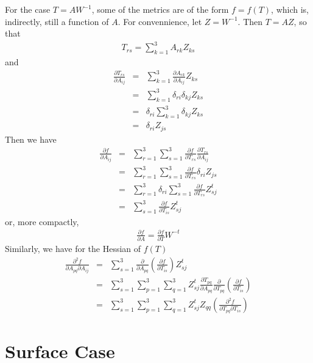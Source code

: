 \documentclass{report}
\begin{document}
 \newline
For the case $T = A W^{-1}$, some of the metrics are of the form $f=f(T)$,
which is, indirectly, still a function of $A$.  For convennience, let
$Z = W^{-1}$.  Then $T = A Z$, so that 
\begin{eqnarray}
T_{rs} = \sum_{k=1}^3 A_{rk} Z_{ks}
\end{eqnarray}
and 
\begin{eqnarray}
\frac{\partial T_{rs}}{\partial A_{ij}} & = & \sum_{k=1}^3 \frac{\partial A_{rk}}{\partial A_{ij}} Z_{ks} \\
 & = & \sum_{k=1}^3 \delta_{ri} \delta_{kj} Z_{ks} \\
 & = & \delta_{ri} \sum_{k=1}^3 \delta_{kj} Z_{ks} \\
 & = & \delta_{ri} Z_{js}
\end{eqnarray}
Then we have
\begin{eqnarray}
\frac{\partial f}{\partial A_{ij}} & = & \sum_{r=1}^3 \sum_{s=1}^3 \frac{\partial f}{\partial T_{rs}} \frac{\partial T_{rs}}{\partial A_{ij}} \\
 & = & \sum_{r=1}^3 \sum_{s=1}^3 \frac{\partial f}{\partial T_{rs}} \delta_{ri} Z_{js} \\
 & = & \sum_{r=1}^3 \delta_{ri} \sum_{s=1}^3 \frac{\partial f}{\partial T_{rs}} Z_{sj}^t \\
 & = & \sum_{s=1}^3 \frac{\partial f}{\partial T_{is}} Z_{sj}^t 
\end{eqnarray}
or, more compactly,
\begin{eqnarray}
\frac{\partial f}{\partial A} = \frac{\partial f}{\partial T} W^{-t}
\end{eqnarray}
Similarly, we have for the Hessian of $f(T)$
\begin{eqnarray}
\frac{\partial^2 f}{\partial A_{pq} \partial A_{ij}} & = & \sum_{s=1}^3 \frac{\partial}{\partial A_{pq}} \left( \frac{\partial f}{\partial T_{is}} \right) Z_{sj}^t \\
 & = & \sum_{s=1}^3 \sum_{p=1}^3 \sum_{q=1}^3  Z_{sj}^t \frac{\partial T_{pq}}{\partial A_{pq}}  \frac{\partial}{\partial T_{pq}} \left( \frac{\partial f}{\partial T_{is}} \right) \\
 & = & \sum_{s=1}^3 \sum_{p=1}^3 \sum_{q=1}^3  Z_{sj}^t Z_{qq} \left( \frac{\partial^2 f}{\partial T_{pq} \partial T_{is}} \right)
\end{eqnarray}

\section{Surface Case}
\end{document}
